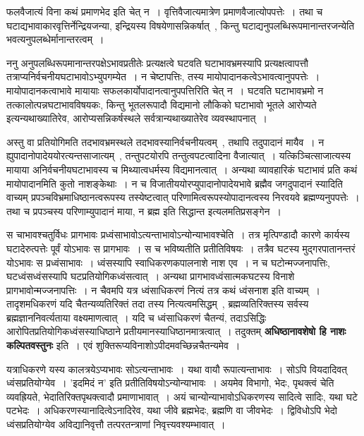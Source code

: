 	फलवैजात्यं विना कथं प्रमाणभेद इति चेत् न~। वृत्तिवैजात्यमात्रेण प्रमाणवैजात्योपपत्तेः~। तथा च घटाद्यभावाकारवृत्तिर्नेन्द्रियजन्या, इन्द्रियस्य विषयेणासन्निकर्षात्~, किन्तु घटाद्यनुपलब्धिरूपमानान्तरजन्येति भवत्यनुपलब्धेर्मानान्तरत्वम्~।\par
	ननु अनुपलब्धिरूपमानान्तरपक्षेऽभावप्रतीतेः प्रत्यक्षत्वे घटवति घटाभावभ्रमस्यापि प्रत्यक्षत्वापत्तौ तत्राप्यनिर्वचनीयघटाभावोऽभ्युपगम्येत~। न चेष्टापत्तिः, तस्य मायोपादानकत्वेऽभावत्वानुपपत्तेः~। मायोपादानकत्वाभावे मायायाः सफलकार्योपादानत्वानुपपत्तिरिति चेत् न~। घटवति घटाभावभ्रमो न तत्कालोत्पन्नघटाभावविषयकः, किन्तु भूतलरूपादौ विद्यमानो लौकिको घटाभावो भूतले आरोप्यते इत्यन्यथाख्यातिरेव, आरोप्यसन्निकर्षस्थले सर्वत्रान्यथाख्यातेरेव व्यवस्थापनात्~।\par
	अस्तु वा प्रतियोगिमति तदभावभ्रमस्थले तदभावस्यानिर्वचनीयत्वम्~, तथापि तदुपादानं मायैव~। न ह्युपादानोपादेययोरत्यन्तसाजात्यम्~, तन्तुपटयोरपि तन्तुत्वपटत्वादिना वैजात्यात्~। यत्किञ्चित्साजात्यस्य मायाया अनिर्वचनीयघटाभावस्य च मिथ्यात्वधर्मस्य विद्यमानत्वात्~। अन्यथा व्यावहारिकं घटाभावं प्रति कथं मायोपादानमिति कुतो नाशङ्केथाः~। न च विजातीययोरप्युपादानोपादेयभावे ब्रह्मैव जगदुपादानं स्यादिति वाच्यम् प्रपञ्चविभ्रमाधिष्ठानत्वरूपस्य तस्येष्टत्वात् परिणामित्वरूपस्योपादानत्वस्य निरवयवे ब्रह्मण्यनुपपत्तेः~। तथा च प्रपञ्चस्य परिणाम्युपादानं माया, न ब्रह्म इति सिद्धान्त इत्यलमतिप्रसङ्गेन~।\par
	स चाभावश्चतुर्विधः प्रागभावः प्रध्वंसाभावोऽत्यन्ताभावोऽन्योन्याभावश्चेति~। तत्र मृत्पिण्डादौ कारणे कार्यस्य घटादेरुत्पत्तेः पूर्वं योऽभावः स प्रागभावः~। स च भविष्यतीति प्रतीतिविषयः~। तत्रैव घटस्य मुद्गरपातानन्तरं योऽभावः स प्रध्वंसाभावः~। ध्वंसस्यापि स्वाधिकरणकपालनाशे नाश एव~। न च घटोन्मज्जनापत्तिः, घटध्वंसध्वंसस्यापि घटप्रतियोगिकध्वंसत्वात्~। अन्यथा प्रागभावध्वंसात्मकघटस्य विनाशे प्रागभावोन्मज्जनापत्तिः~। न चैवमपि यत्र ध्वंसाधिकरणं नित्यं तत्र कथं ध्वंसनाश इति वाच्यम्~। तादृशमधिकरणं यदि चैतन्यव्यतिरिक्तं तदा तस्य नित्यत्वमसिद्धम्~, ब्रह्मव्यतिरिक्तस्य सर्वस्य ब्रह्मज्ञाननिवर्त्यताया वक्ष्यमाणत्वात्~। यदि च ध्वंसाधिकरणं चैतन्यं, तदाऽसिद्धिः आरोपितप्रतियोगिकध्वंसस्याधिष्ठाने प्रतीयमानस्याधिष्ठानमात्रत्वात्~। तदुक्तम् {\bfseries अधिष्ठानावशेषो हि नाशः कल्पितवस्तुनः} इति~। एवं शुक्तिरूप्यविनाशोऽपीदमवच्छिन्नचैतन्यमेव~।\par
	यत्राधिकरणे यस्य कालत्रयेऽप्यभावः सोऽत्यन्ताभावः~। यथा वायौ रूपात्यन्ताभावः~। सोऽपि वियदादिवत् ध्वंसप्रतियोग्येव~। 'इदमिदं न' इति प्रतीतिविषयोऽन्योन्याभावः~। अयमेव विभागो, भेदः, पृथक्त्वं चेति व्यवह्रियते, भेदातिरिक्तपृथक्त्वादौ प्रमाणाभावात्~। अयं चान्योन्याभावोऽधिकरणस्य सादित्वे सादिः, यथा घटे पटभेदः~। अधिकरणस्यानादित्वेऽनादिरेव, यथा जीवे ब्रह्मभेदः, ब्रह्मणि वा जीवभेदः~। द्विविधोऽपि भेदो ध्वंसप्रतियोग्येव अविद्यानिवृत्तौ तत्परतन्त्राणां निवृत्त्यवश्यम्भावात्~।\par
